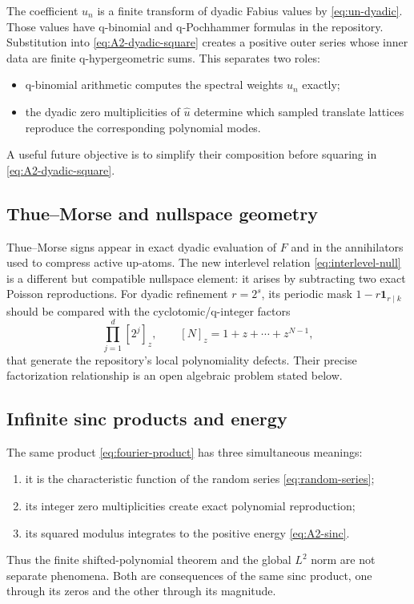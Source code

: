 \documentclass[11pt,oneside]{article}
\numberwithin{equation}{section}
\theoremstyle{definition}
\theoremstyle{remark}
\newcommand{\one}{\mathbf 1}
\begin{document}
The coefficient $u_n$ is a finite transform of dyadic Fabius values by
\eqref{eq:un-dyadic}.  Those values have q-binomial and q-Pochhammer formulas in
the repository.  Substitution into \eqref{eq:A2-dyadic-square} creates a
positive outer series whose inner data are finite q-hypergeometric sums.  This
separates two roles:
\begin{itemize}
 \item q-binomial arithmetic computes the spectral weights $u_n$ exactly;
 \item the dyadic zero multiplicities of $\widehat u$ determine which sampled
 translate lattices reproduce the corresponding polynomial modes.
\end{itemize}
A useful future objective is to simplify their composition before squaring in
\eqref{eq:A2-dyadic-square}.

\subsection{Thue--Morse and nullspace geometry}

Thue--Morse signs appear in exact dyadic evaluation of $F$ and in the
annihilators used to compress active up-atoms.  The new interlevel relation
\eqref{eq:interlevel-null} is a different but compatible nullspace element: it
arises by subtracting two exact Poisson reproductions.  For dyadic refinement
$r=2^s$, its periodic mask $1-r\one_{r\mid k}$ should be compared with the
cyclotomic/q-integer factors
\begin{equation}
 \prod_{j=1}^{d}[2^j]_z,
 \qquad [N]_z=1+z+\cdots+z^{N-1},
 \label{eq:q-annihilator}
\end{equation}
that generate the repository's local polynomiality defects.  Their precise
factorization relationship is an open algebraic problem stated below.

\subsection{Infinite sinc products and energy}

The same product \eqref{eq:fourier-product} has three simultaneous meanings:
\begin{enumerate}
 \item it is the characteristic function of the random series
 \eqref{eq:random-series};
 \item its integer zero multiplicities create exact polynomial reproduction;
 \item its squared modulus integrates to the positive energy
 \eqref{eq:A2-sinc}.
\end{enumerate}
Thus the finite shifted-polynomial theorem and the global $L^2$ norm are not
separate phenomena.  Both are consequences of the same sinc product, one
through its zeros and the other through its magnitude.
\end{document}
